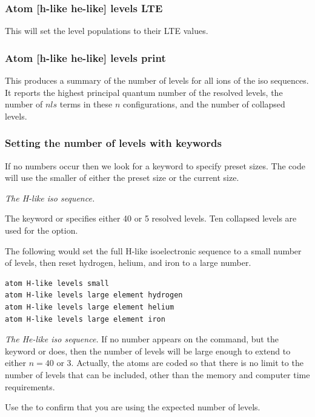 \subsubsection{Atom [h-like \OR{} he-like] levels LTE}

This will set the level populations to their LTE values.

\subsubsection{Atom [h-like \OR{} he-like] levels print}

This produces a summary of the number of levels for all ions of the iso sequences.
It reports the highest principal quantum number of the resolved levels,
the number of $nls$ terms in these $n$ configurations,
and the number of collapsed levels.

\subsubsection{Setting the number of levels with keywords}

If no numbers occur then we look for a keyword to specify preset sizes.
The code will use the smaller of either the preset size or the current size.

\emph{The H-like iso sequence.}

The keyword
 or 
specifies either 40 or 5 resolved levels.
Ten collapsed levels are used for the  option.

The following would set the full H-like isoelectronic
sequence to a small number of levels, then reset hydrogen, helium,
and iron to a large number.
\begin{verbatim}
atom H-like levels small
atom H-like levels large element hydrogen
atom H-like levels large element helium
atom H-like levels large element iron
\end{verbatim}

\emph{The He-like iso sequence.}
If no number appears on the command, but the keyword  or
 does,
then the number of levels will be large enough to extend
to either $n = 40$ or 3.
Actually, the atoms are
coded so that there is no limit to the number of levels that
can be included, other than the memory and computer time requirements.

Use the  to confirm that you are using
the expected number of levels.


